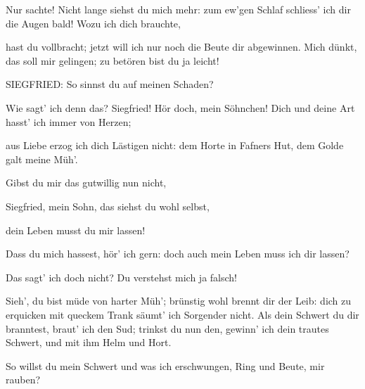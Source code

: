 \begin{drama}
Nur sachte! Nicht lange
siehst du mich mehr:
zum ew'gen Schlaf
schliess' ich dir die Augen bald!
Wozu ich dich brauchte,


hast du vollbracht;
jetzt will ich nur noch
die Beute dir abgewinnen.
Mich dünkt, das soll mir gelingen;
zu betören bist du ja leicht!

SIEGFRIED:
So sinnst du auf meinen Schaden?

\Mimespeaks


Wie sagt' ich denn das?
Siegfried! Hör doch, mein Söhnchen!
Dich und deine Art
hasst' ich immer von Herzen;


aus Liebe erzog ich
dich Lästigen nicht:
dem Horte in Fafners Hut,
dem Golde galt meine Müh'.


Gibst du mir das
gutwillig nun nicht,


Siegfried, mein Sohn,
das siehst du wohl selbst,


dein Leben musst du mir lassen!

\Siegfriedspeaks

Dass du mich hassest,
hör' ich gern:
doch auch mein Leben muss ich dir lassen?

\Mimespeaks


Das sagt' ich doch nicht?
Du verstehst mich ja falsch!


Sieh', du bist müde
von harter Müh';
brünstig wohl brennt dir der Leib:
dich zu erquicken
mit queckem Trank
säumt' ich Sorgender nicht.
Als dein Schwert du dir branntest,
braut' ich den Sud;
trinkst du nun den,
gewinn' ich dein trautes Schwert,
und mit ihm Helm und Hort.


\Siegfriedspeaks

So willst du mein Schwert
und was ich erschwungen,
Ring und Beute, mir rauben?

\Mimespeaks



\end{drama}
